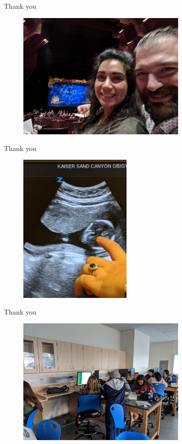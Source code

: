 \documentclass{beamer}
\begin{document}
\begin{frame}{Thank you}
\begin{figure}
\centering
\includegraphics[width=0.75\textwidth]{IMG_20191109_191859.jpg}
\end{figure}
\end{frame}

\begin{frame}{Thank you}
\begin{figure}
\centering
\includegraphics[width=0.5\textwidth]{IMG_20191108_073729.jpg}
\end{figure}
\end{frame}

\begin{frame}{Thank you}
\begin{figure}
\centering
\includegraphics[width=0.75\textwidth]{IMG_20191113_153819.jpg}
\end{figure}
\end{frame}
\end{document}
